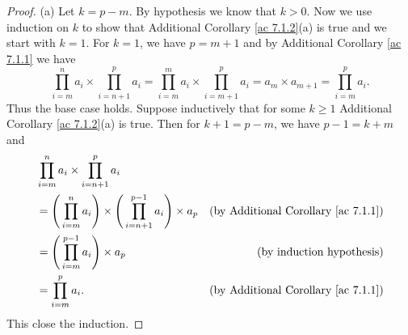 \begin{proof}{(a)}
    Let \(k = p - m\).
    By hypothesis we know that \(k > 0\).
    Now we use induction on \(k\) to show that Additional Corollary \ref{ac 7.1.2}(a) is true and we start with \(k = 1\).
    For \(k = 1\), we have \(p = m + 1\) and by Additional Corollary \ref{ac 7.1.1} we have
    \[
        \prod_{i = m}^n a_i \times \prod_{i = n + 1}^p a_i = \prod_{i = m}^m a_i \times \prod_{i = m + 1}^p a_i = a_m \times a_{m + 1} = \prod_{i = m}^p a_i.
    \]
    Thus the base case holds.
    Suppose inductively that for some \(k \geq 1\) Additional Corollary \ref{ac 7.1.2}(a) is true.
    Then for \(k + 1 = p - m\), we have \(p - 1 = k + m\) and
    \begin{align*}
         & \prod_{i = m}^n a_i \times \prod_{i = n + 1}^p a_i                                                                                              \\
         & = \Bigg(\prod_{i = m}^n a_i\Bigg) \times \Bigg(\prod_{i = n + 1}^{p - 1} a_i\Bigg) \times a_p & \text{(by Additional Corollary \ref{ac 7.1.1})} \\
         & = \Bigg(\prod_{i = m}^{p - 1} a_i\Bigg) \times a_p                                            & \text{(by induction hypothesis)}                \\
         & = \prod_{i = m}^p a_i.                                                                        & \text{(by Additional Corollary \ref{ac 7.1.1})}
    \end{align*}
    This close the induction.
\end{proof}

